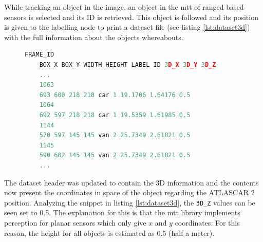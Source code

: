 While tracking an object in the image, an object in the \gls{mtt} of ranged based sensors is selected and its ID is retrieved. This object is followed and its position is given to the labelling node to print a dataset file (see listing \ref{lst:dataset3d}) with the full information about the objects whereabouts.

\begin{figure}
\begin{center}
	\begin{lstlisting}[label={lst:dataset3d}, caption={Snippet of the dataset with 3D capabilities},language=c++]
	FRAME_ID
	BOX_X BOX_Y WIDTH HEIGHT LABEL ID 3D_X 3D_Y 3D_Z
	...
	1063
	693 600 218 218 car 1 19.1706 1.64176 0.5
	1064
	692 597 218 218 car 1 19.5359 1.61985 0.5
	1144
	570 597 145 145 van 2 25.7349 2.61821 0.5
	1145
	590 602 145 145 van 2 25.7349 2.61821 0.5
	...		\end{lstlisting}
\end{center}
\end{figure}

The dataset header was updated to contain the 3D information and the contents now present the coordinates in space of the object regarding the ATLASCAR 2 position. Analyzing the snippet in listing \ref{lst:dataset3d}, the \texttt{3D\_Z} values can be seen set to 0.5. The explanation for this is that the \gls{mtt} library implements perception for planar sensors which only give $x$ and $y$ coordinates. For this reason, the height for all objects is estimated as 0.5 (half a meter). 
